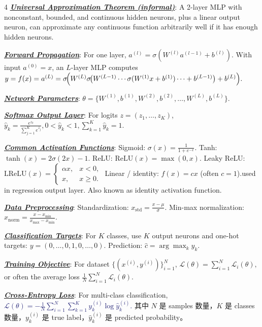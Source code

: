 \documentclass[12pt]{article}
\newcommand{\bulletPoint}[1]{\underline{\textit{\textbf{#1}}}}
\begin{document}
\begin{multicols*}{4}
\bulletPoint{Universal Approximation Theorem (informal)}:
A 2-layer MLP with nonconstant, bounded, and continuous hidden neurons, plus a linear output neuron, can approximate any continuous function arbitrarily well if it has enough hidden neurons.




\bulletPoint{Forward Propagation}:
For one layer,
$a^{(l)}=\sigma\!\left(W^{(l)}a^{(l-1)}+b^{(l)}\right).$
With input $a^{(0)}=x$, an $L$-layer MLP computes
\textcolor{blue!50!black}{$\textstyle
y=f(x)=a^{(L)}
=\sigma\!\Bigl(W^{(L)}\sigma\!\bigl(W^{(L-1)}\cdots \sigma(W^{(1)}x+b^{(1)})\cdots +b^{(L-1)}\bigr)+b^{(L)}\Bigr).
$}

\bulletPoint{Network Parameters}:
$\theta=\{W^{(1)},b^{(1)},W^{(2)},b^{(2)},\dots,W^{(L)},b^{(L)}\}.$

\bulletPoint{Softmax Output Layer}:
For logits $z=(z_1,\dots,z_K)$,
\textcolor{purple!60!black}{$\textstyle
\hat y_k=\frac{e^{z_k}}{\sum_{j=1}^K e^{z_j}},
0<\hat y_k<1,
\sum_{k=1}^K \hat y_k=1.
$}

\bulletPoint{Common Activation Functions}:
Sigmoid:
$\sigma(x)=\frac{1}{1+e^{-x}}.$
Tanh:
$\tanh(x)=2\sigma(2x)-1.$
ReLU:
$\mathrm{ReLU}(x)=\max(0,x).$
Leaky ReLU:
$\mathrm{LReLU}(x)=\begin{cases}\alpha x,&x<0,\\x,&x\ge 0.\end{cases}$
Linear / identity:
$f(x)=cx$ (often $c=1$).used in regression output layer. 
Also known as identity activation function.

\bulletPoint{Data Preprocessing}:
Standardization:
$x_{\mathrm{std}}=\frac{x-\mu}{\sigma}.$
Min-max normalization:
$x_{\mathrm{norm}}=\frac{x-x_{\min}}{x_{\max}-x_{\min}}.$

\bulletPoint{Classification Targets}:
For $K$ classes, use $K$ output neurons and one-hot targets:
$y=(0,\dots,0,1,0,\dots,0).$
Prediction:
$\hat c=\arg\max_k \hat y_k.$

\bulletPoint{Training Objective}:
For dataset $\{(x^{(i)},y^{(i)})\}_{i=1}^N$,
$\mathcal L(\theta)=\sum_{i=1}^N \mathcal L_i(\theta),$
or often the average loss
$\frac{1}{N}\sum_{i=1}^N \mathcal L_i(\theta).$

\bulletPoint{Cross-Entropy Loss}:
For multi-class classification,
\textcolor{MidnightBlue}{\boldmath $\textstyle
\mathcal L(\theta)
=
-\frac{1}{N}\sum_{i=1}^N \sum_{k=1}^K
y_k^{(i)}\log \hat y_k^{(i)}.
$}
其中 $N$ 是 samples 数量，$K$ 是 classes 数量，$y_k^{(i)}$ 是 true label，$\hat y_k^{(i)}$ 是 predicted probability。


\end{multicols*}
\end{document}
